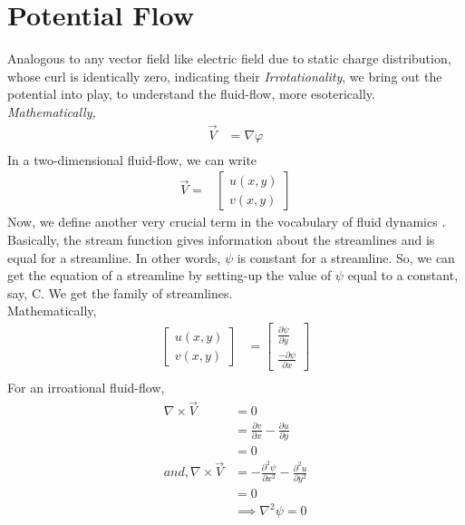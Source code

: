 \documentclass{book}
\begin{document}
\section{Potential Flow}
Analogous to any vector field like electric field due to static charge distribution, whose curl is identically zero, indicating their \emph{Irrotationality}, we bring out the potential into play, to understand the fluid-flow, more esoterically.
\emph{Mathematically,}\\
\begin{equation}
\begin{split}
\vec{V}&=\nabla{\varphi}\\
\end{split}
\end{equation}
In a two-dimensional fluid-flow, we can write\textemdash
\begin{equation*}
\begin{split}
\vec{V}=&\begin{bmatrix}u(x,y)\\v(x,y)\end{bmatrix}
\end{split}
\end{equation*}
Now, we define another very crucial term in the vocabulary of fluid dynamics . Basically, the stream function gives information about the streamlines and is equal for a streamline. In other words, $\psi$ is constant for a streamline. So, we can get the equation of a streamline by setting-up the value of $\psi$ equal to a constant, say, C. We get the family of streamlines.\\
Mathematically,\\
\begin{equation}
\begin{split}
\begin{bmatrix}u(x,y)\\v(x,y)\end{bmatrix}&=\begin{bmatrix}\frac{\partial{\psi}}{\partial y}\\{\frac{-\partial{\psi}}{\partial x}}\end{bmatrix}\\
\end{split}
\end{equation}
For an irroational fluid-flow,
\begin{equation*}
\begin{split}
\nabla\times\vec{V}&=0\\
&=\frac{\partial v}{\partial x}-\frac{\partial u}{\partial y}\\
&=0\\
and,
\nabla\times\vec{V}&=-\frac{\partial^2 \psi}{\partial x^2}-\frac{\partial^2 u}{\partial y^2}\\
&=0\\
&\implies\nabla^2{\psi}=0
\end{split}
\end{equation*}
\end{document}
